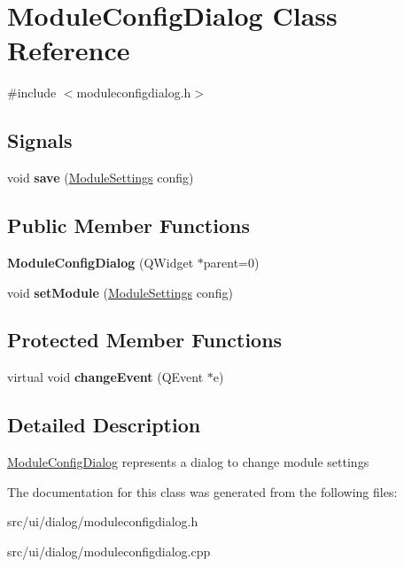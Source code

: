 \hypertarget{classModuleConfigDialog}{
\section{ModuleConfigDialog Class Reference}
\label{classModuleConfigDialog}
}


{\ttfamily \#include $<$moduleconfigdialog.h$>$}\subsection*{Signals}
\begin{DoxyCompactItemize}
\item 
\hypertarget{classModuleConfigDialog_a84f3addff3fdb1f9ceac5efad6a21c37}{
void {\bfseries save} (\hyperlink{classModuleSettings}{ModuleSettings} config)}
\label{classModuleConfigDialog_a84f3addff3fdb1f9ceac5efad6a21c37}

\end{DoxyCompactItemize}
\subsection*{Public Member Functions}
\begin{DoxyCompactItemize}
\item 
\hypertarget{classModuleConfigDialog_aeb291f87e7e3749701299118e521ddc0}{
{\bfseries ModuleConfigDialog} (QWidget $\ast$parent=0)}
\label{classModuleConfigDialog_aeb291f87e7e3749701299118e521ddc0}

\item 
\hypertarget{classModuleConfigDialog_aa66110dc25bdd33d6b5960b87e15beb1}{
void {\bfseries setModule} (\hyperlink{classModuleSettings}{ModuleSettings} config)}
\label{classModuleConfigDialog_aa66110dc25bdd33d6b5960b87e15beb1}

\end{DoxyCompactItemize}
\subsection*{Protected Member Functions}
\begin{DoxyCompactItemize}
\item 
\hypertarget{classModuleConfigDialog_a0eeda84ed46ffc60b77183542eb4f583}{
virtual void {\bfseries changeEvent} (QEvent $\ast$e)}
\label{classModuleConfigDialog_a0eeda84ed46ffc60b77183542eb4f583}

\end{DoxyCompactItemize}


\subsection{Detailed Description}
\hyperlink{classModuleConfigDialog}{ModuleConfigDialog} represents a dialog to change module settings 

The documentation for this class was generated from the following files:\begin{DoxyCompactItemize}
\item 
src/ui/dialog/moduleconfigdialog.h\item 
src/ui/dialog/moduleconfigdialog.cpp\end{DoxyCompactItemize}
